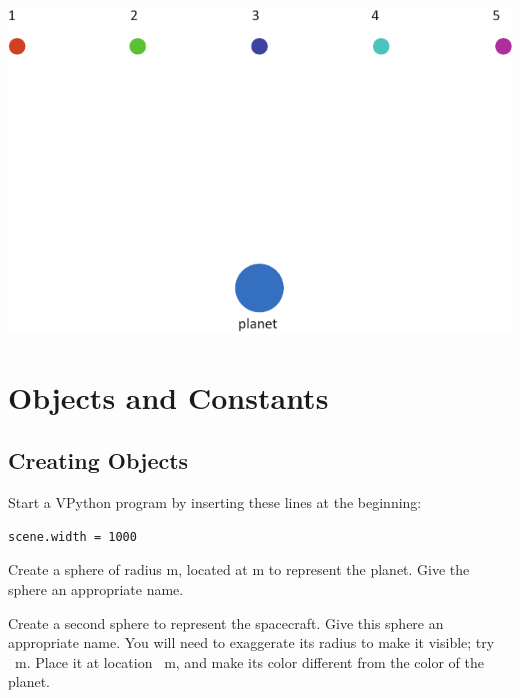 \documentclass[11pt]{article}
\begin{document}
\begin{center}
\includegraphics{planet_5_spacecraft.pdf}
\end{center}

\vspace*{10pt}

\section{Objects and Constants}

\subsection{Creating Objects}

\begin{compactitem}[\color{MIRed}$\Rightarrow$]
\item Start a VPython program by inserting these lines at the beginning:\\
\color{CodeColor}
\begin{verbatim}
scene.width = 1000
\end{verbatim}
\color{black}
\vspace*{10pt}
\item Create a sphere of radius  m, located at  m to represent the planet. Give the sphere an appropriate name.
\item Create a second sphere to represent the spacecraft. Give this sphere an appropriate name. You will need to exaggerate its radius to make it visible; try ~m.  Place it at location ~m, and make its color different from the color of the planet.
\end{compactitem}
\end{document}
